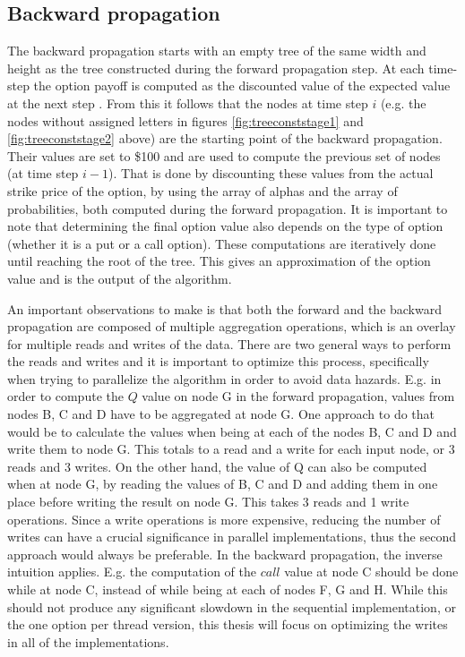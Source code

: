 \subsection{Backward propagation}
The backward propagation starts with an empty tree of the same width and height as the tree constructed during the forward propagation step. At each time-step the option payoff is computed as the discounted value of the expected value at the next step \cite[pg. 6]{uhwirt}. From this it follows that the nodes at time step $i$ (e.g. the nodes without assigned letters in figures \ref{fig:treeconststage1} and \ref{fig:treeconststage2} above) are the starting point of the backward propagation. Their values are set to \$100 and are used to compute the previous set of nodes (at time step $i-1$). That is done by discounting these values from the actual strike price of the option, by using the array of alphas and the array of probabilities, both computed during the forward propagation. It is important to note that determining the final option value also depends on the type of option (whether it is a put or a call option). These computations are iteratively done until reaching the root of the tree. This gives an approximation of the option value and is the output of the algorithm. 

An important observations to make is that both the forward and the backward propagation are composed of multiple aggregation operations, which is an overlay for multiple reads and writes of the data. There are two general ways to perform the reads and writes and it is important to optimize this process, specifically when trying to parallelize the algorithm in order to avoid data hazards. E.g. in order to compute the $Q$ value on node G in the forward propagation, values from nodes B, C and D have to be aggregated at node G. One approach to do that would be to calculate the values when being at each of the nodes B, C and D and write them to node G. This totals to a read and a write for each input node, or 3 reads and 3 writes. On the other hand, the value of Q can also be computed when at node G, by reading the values of B, C and D and adding them in one place before writing the result on node G. This takes 3 reads and 1 write operations. Since a write operations is more expensive, reducing the number of writes can have a crucial significance in parallel implementations, thus the second approach would always be preferable. In the backward propagation, the inverse intuition applies. E.g. the computation of the $call$ value at node C should be done while at node C, instead of while being at each of nodes F, G and H. While this should not produce any significant slowdown in the sequential implementation, or the one option per thread version, this thesis will focus on optimizing the writes in all of the implementations.